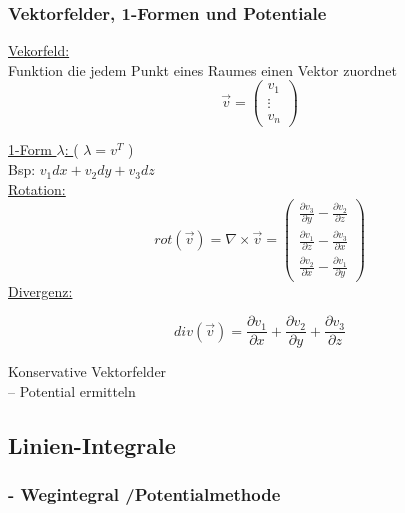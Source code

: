 \documentclass[6pt]{article}
\begin{document}
\begin{multicols*}{3}
	

	\subsubsection*{Vektorfelder, 1-Formen und Potentiale}

	\underline{Vekorfeld:} \\
		Funktion die jedem Punkt eines Raumes einen Vektor zuordnet 
		\[
				\vec{v} = \begin{pmatrix} v_1 \\ \vdots \\ v_n\end{pmatrix} 
		\]
		
		\underline{1-Form $\lambda$: }  \quad ( $\lambda = v^T$ ) \\
		
		Bsp: \quad $v_1 dx + v_2 dy + v_3 dz$ \vspace{2mm}\\

		\underline{Rotation:}
		\[
				rot(\vec{v}) = \nabla \times \vec{v} = 
				\begin{pmatrix} 
					\frac{\partial v_3}{\partial y} - \frac{\partial v_2}{\partial z} \\
					\frac{\partial v_1}{\partial z} - \frac{\partial v_3}{\partial x} \\
					\frac{\partial v_2}{\partial x} - \frac{\partial v_1}{\partial y} 
				\end{pmatrix}
		\]
		\underline{Divergenz:}
		
		\[
				div(\vec{v}) = \frac{\partial v_1}{\partial x} + \frac{\partial v_2}{\partial y} + \frac{\partial v_3}{\partial z}
		\]
		
	

	Konservative Vektorfelder \\
	
	-- Potential ermitteln

	\columnbreak
	\subsection*{Linien-Integrale}
	
	\subsubsection*{- Wegintegral /Potentialmethode}
	

\end{multicols*}
\end{document}
